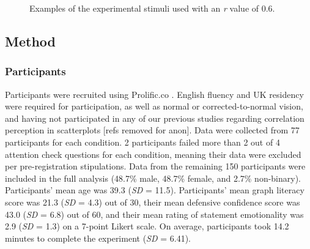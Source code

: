 \documentclass[manuscript,screen,review,anonymous]{acmart}
\begin{document}
\begin{figure}


\caption{\label{fig-main-examples}Examples of the experimental stimuli
used with an \textit{r} value of 0.6.}

\end{figure}%

\subsection{Method}\label{sec-method-main}

\subsubsection{Participants}\label{sec-participants-main}

Participants were recruited using Prolific.co \citep{prolific}. English
fluency and UK residency were required for participation, as well as
normal or corrected-to-normal vision, and having not participated in any
of our previous studies regarding correlation perception in scatterplots
{[}refs removed for anon{]}. Data were collected from 77 participants
for each condition. 2 participants failed more than 2 out of 4 attention
check questions for each condition, meaning their data were excluded per
pre-registration stipulations. Data from the remaining 150 participants
were included in the full analysis (48.7\% male, 48.7\% female, and
2.7\% non-binary). Participants' mean age was 39.3 (\emph{SD} = 11.5).
Participants' mean graph literacy score was 21.3 (\emph{SD} = 4.3) out
of 30, their mean defensive confidence score was 43.0 (\emph{SD} = 6.8)
out of 60, and their mean rating of statement emotionality was 2.9
(\emph{SD} = 1.3) on a 7-point Likert scale. On average, participants
took 14.2 minutes to complete the experiment (\emph{SD} = 6.41).
\end{document}
